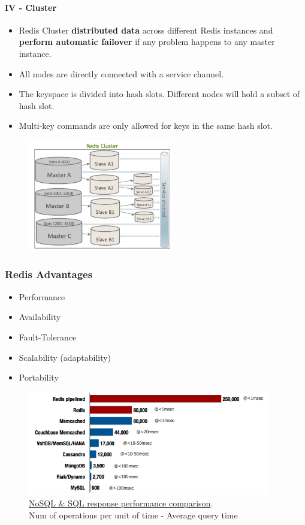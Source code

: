 \documentclass[10pt,a4paper]{article}
\begin{document}
\paragraph{IV - Cluster} 
\begin{itemize}
	\item Redis Cluster \textbf{distributed data} across different Redis instances and \textbf{perform automatic failover} if any problem happens to any master instance.
	\item All nodes are directly connected with a service channel.
	\item The keyspace is divided into hash slots. Different nodes will hold a subset of hash slot.
	\item Multi-key commands are only allowed for keys in the same  hash slot.
\end{itemize}

\begin{figure}[h!]
 \hfill \includegraphics[width=180pt]{images/redis-cluster.png}\hspace*{\fill}
\end{figure} 

\subsubsection{Redis Advantages}
\begin{itemize}
	\item Performance
	\item Availability
	\item Fault-Tolerance
	\item Scalability (adaptability)
	\item Portability
\end{itemize}

\begin{figure}[h!]
 \hfill \includegraphics[width=300pt]{images/redis-performance.png}\hspace*{\fill}
 \caption{\href{https://redislabs.com/blog/the-proven-redis-performance/}{NoSQL \& SQL response performance comparison}. \\ Num of operations per unit of time - Average query time}
\end{figure} 
\end{document}
